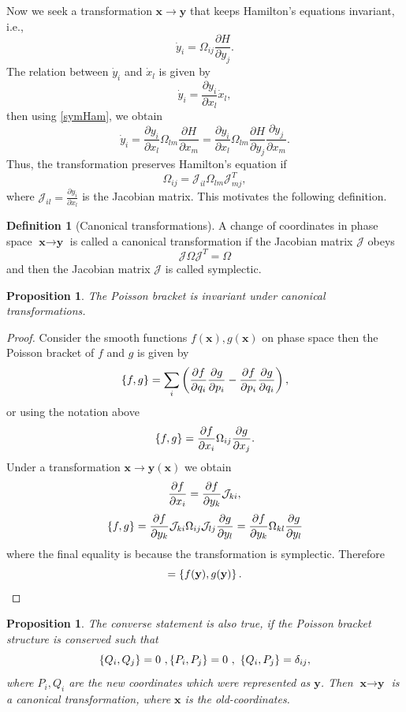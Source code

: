 \documentclass[12pt,oneside]{report}
\newtheorem{Proposition}[theorem]{Proposition}
\theoremstyle{definition}
\newtheorem{definition}{Definition}
\renewcommand{\d}{\partial}
\begin{document}
Now we seek a transformation $\mathbf{x} \rightarrow \mathbf{y}$ that keeps Hamilton's equations invariant, i.e.,
\[
\dot{y}_{i} = \Omega_{ij} \frac{\partial H}{\d y_{j}}.
\]
The relation between $\dot{y}_{i}$ and $\dot{x}_{l}$ is given by
\[
\dot{y}_{i} = \frac{\partial y_{i}}{\partial x_{l}} \dot{x}_{l},
\]
then using \autoref{symHam}, we obtain
\[
\dot{y}_{i} = \frac{\partial y_{i}}{\partial x_{l}} \Omega_{lm} \frac{\partial H}{\d x_{m}} = \frac{\partial y_{i}}{\partial x_{l}} \Omega_{lm} \frac{\partial H}{\d y_{j}} \frac{\partial y_{j}}{\partial x_{m}}.
\]
Thus, the transformation preserves Hamilton's equation if
\[
\Omega_{ij} = \mathcal{J}_{il} \Omega_{lm} \mathcal{J}^{T}_{mj},
\]
where $\mathcal{J}_{il} = \frac{\partial y_{i}}{\partial x_{l}}$ is the Jacobian matrix. This motivates the following definition.
\begin{definition}[Canonical transformations]
  A change of coordinates in phase space $\textbf{x} \rightarrow \textbf{y}$ is called a canonical transformation if the Jacobian matrix $\mathcal{J}$ obeys $$\mathcal{J}\Omega\mathcal{J}^{T} = \Omega$$ 
  and then the Jacobian matrix $\mathcal{J}$ is called symplectic. \end{definition}



\begin{Proposition}
    The Poisson bracket is invariant under canonical transformations. 
\end{Proposition}
\begin{proof}
    Consider the smooth functions $f(\textbf{x}),g(\textbf{x})$ on phase space then the Poisson bracket of $f$ and $g$ is given by
    $$\displaystyle \left\{ f , g \right\} = \sum_{i} \left( \displaystyle\frac{\partial f}{\partial q_{i}}\displaystyle\frac{\partial g}{\partial p_{i}}-\displaystyle\frac{\partial f}{\partial p_{i}}\displaystyle\frac{\partial g}{\partial q_{i}} \right),$$
    or using the notation above
    $$\displaystyle \left\{ f , g \right\} = \displaystyle\frac{\partial f}{\partial x_{i}}\Omega_{ij}\displaystyle\frac{\partial g}{\partial x_{j}}.$$
    Under a transformation $\textbf{x} \rightarrow \textbf{y}(\textbf{x})$ we obtain
    $$  \displaystyle\frac{\partial f}{\partial x_{i}} = \displaystyle\frac{\partial f}{\partial y_{k}}\mathcal{J}_{ki},$$
    $$\displaystyle \left\{ f , g \right\} = \displaystyle\frac{\partial f}{\partial y_{k}}\mathcal{J}_{ki}\Omega_{ij}\mathcal{J}_{lj}\displaystyle\frac{\partial g}{\partial y_{l}} = \displaystyle\frac{\partial f}{\partial y_{k}}\Omega_{kl}\displaystyle\frac{\partial g}{\partial y_{l}}$$
        where the final equality is because the transformation is symplectic. Therefore
    $$  = \displaystyle \left\{ f(\textbf{y}) , g(\textbf{y}) \right\}.$$

\end{proof}

\begin{Proposition}
 The converse statement is also true, if the Poisson bracket structure is conserved such that $$ \pb{Q_{i}}{Q_{j}} = 0 \ , \pb{P_{i}}{P_{j}} = 0 \ , \ \pb{Q_{i}}{P_{j}} = \delta_{ij},$$ where ${P_{i}},{Q_{i}}$ are the new coordinates which were represented as $\textbf{y}$. Then $\textbf{x} \rightarrow \textbf{y}$ is a canonical transformation, where $\textbf{x}$ is the old-coordinates.    
\end{Proposition}
\end{document}
